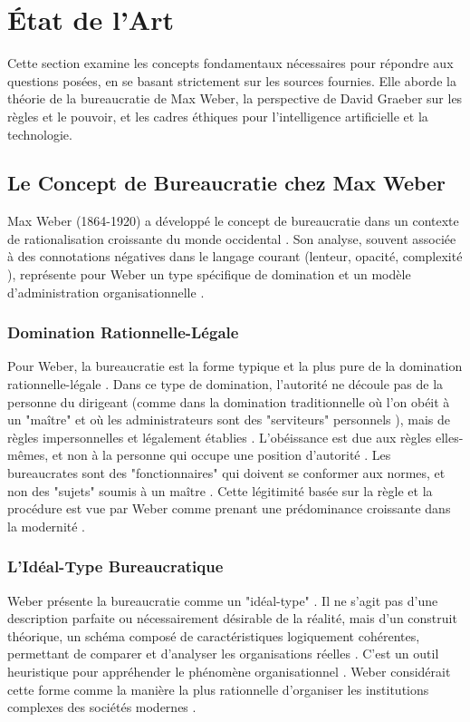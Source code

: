 \documentclass[10pt, twocolumn]{article}
\begin{document}
\section{État de l'Art}

Cette section examine les concepts fondamentaux nécessaires pour répondre aux questions posées, en se basant strictement sur les sources fournies. Elle aborde la théorie de la bureaucratie de Max Weber, la perspective de David Graeber sur les règles et le pouvoir, et les cadres éthiques pour l'intelligence artificielle et la technologie.

\subsection{Le Concept de Bureaucratie chez Max Weber}

Max Weber (1864-1920) a développé le concept de bureaucratie dans un contexte de rationalisation croissante du monde occidental \citep{Serpa2019}. Son analyse, souvent associée à des connotations négatives dans le langage courant (lenteur, opacité, complexité \citep{Serpa2019}), représente pour Weber un type spécifique de domination et un modèle d'administration organisationnelle \citep{Serpa2019, Weber1922}.

\subsubsection{Domination Rationnelle-Légale}
Pour Weber, la bureaucratie est la forme typique et la plus pure de la domination rationnelle-légale \citep{Serpa2019, Weber1922}. Dans ce type de domination, l'autorité ne découle pas de la personne du dirigeant (comme dans la domination traditionnelle où l'on obéit à un "maître" et où les administrateurs sont des "serviteurs" personnels \citep{Serpa2019}), mais de règles impersonnelles et légalement établies \citep{Serpa2019, Weber1922}. L'obéissance est due aux règles elles-mêmes, et non à la personne qui occupe une position d'autorité \citep{Serpa2019, Weber1922, Laguito2024}. Les bureaucrates sont des "fonctionnaires" qui doivent se conformer aux normes, et non des "sujets" soumis à un maître \citep{Serpa2019}. Cette légitimité basée sur la règle et la procédure est vue par Weber comme prenant une prédominance croissante dans la modernité \citep{Weber1922}.

\subsubsection{L'Idéal-Type Bureaucratique}
Weber présente la bureaucratie comme un "idéal-type" \citep{Weber1922, Hussain2019}. Il ne s'agit pas d'une description parfaite ou nécessairement désirable de la réalité, mais d'un construit théorique, un schéma composé de caractéristiques logiquement cohérentes, permettant de comparer et d'analyser les organisations réelles \citep{Weber1922, Hussain2019, RedfameIJSSS}. C'est un outil heuristique pour appréhender le phénomène organisationnel \citep{SerpaLima2019}. Weber considérait cette forme comme la manière la plus rationnelle d'organiser les institutions complexes des sociétés modernes \citep{Laguito2024, Hussain2019, RedfameIJSSS}.
\end{document}
